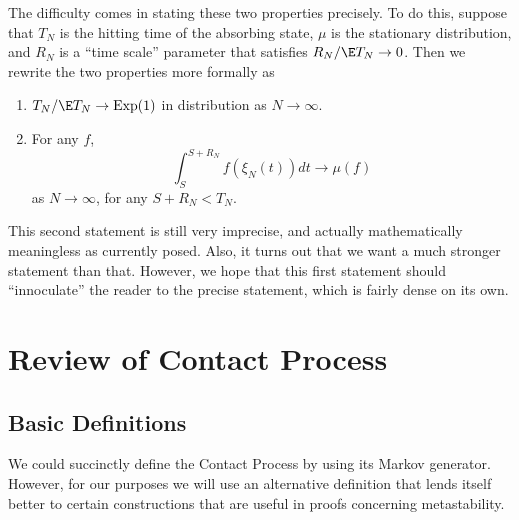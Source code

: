 \documentclass{scrartcl}
\DeclareMathOperator{\expDist}{Exp}
\begin{document}
The difficulty comes in stating these two properties precisely. To do this, suppose that $T_{N}$ is the hitting time of the absorbing state, $\mu$ is the stationary distribution, 
and $R_{N}$ is a ``time scale'' parameter that satisfies $R_{N}/\E T_{N} \to 0$. Then we rewrite the two properties more formally as

\begin{enumerate}
  \item $T_{N} / \E T_{N} \to \expDist(1)$ in distribution as $N \to \infty$.
  \item For any $f$,
    \[ \int_{S}^{S + R_{N}} f(\xi_{N}(t)) dt \to \mu(f) \]
    as $N \to \infty$, for any $S + R_{N} < T_{N}$.
\end{enumerate}

This second statement is still very imprecise, and actually mathematically meaningless as currently posed. Also, it turns out that we want a much stronger statement than that. However, we hope that this first statement should ``innoculate'' the reader to the precise statement, which is fairly dense on its own.

\section{Review of Contact Process}

\subsection{Basic Definitions}

We could succinctly define the Contact Process by using its Markov generator. However, for our purposes we will use
an alternative definition that lends itself better to certain constructions that are useful in proofs concerning metastability.
\end{document}
